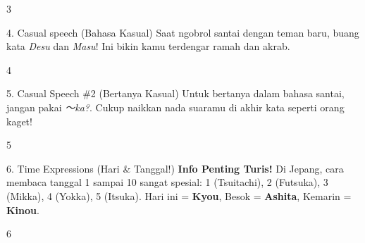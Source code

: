 \begin{convobox}{3}
    \noindent
      
      

    \vspace{1.5em}
\end{convobox}

\begin{lessonbox}{4. Casual speech (Bahasa Kasual)}
    Saat ngobrol santai dengan teman baru, buang kata \textit{Desu} dan \textit{Masu}! Ini bikin kamu terdengar ramah dan akrab.
\end{lessonbox}
\begin{convobox}{4}
    \noindent
      

    \vspace{1.5em}
\end{convobox}

\begin{lessonbox}{5. Casual Speech \#2 (Bertanya Kasual)}
    Untuk bertanya dalam bahasa santai, jangan pakai \textit{〜ka?}. Cukup naikkan nada suaramu di akhir kata seperti orang kaget!
\end{lessonbox}
\begin{convobox}{5}
    \noindent

    \vspace{1.5em}
\end{convobox}

\begin{lessonbox}{6. Time Expressions (Hari \& Tanggal!)}
    \textbf{Info Penting Turis!} Di Jepang, cara membaca tanggal 1 sampai 10 sangat spesial:
    1 (Tsuitachi), 2 (Futsuka), 3 (Mikka), 4 (Yokka), 5 (Itsuka). 
    Hari ini = \textbf{Kyou}, Besok = \textbf{Ashita}, Kemarin = \textbf{Kinou}.
\end{lessonbox}
\begin{convobox}{6}
    \noindent
      
     

    \vspace{1.5em}
\end{convobox}

